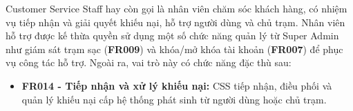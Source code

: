 
Customer Service Staff hay còn gọi là nhân viên chăm sóc khách hàng, có nhiệm vụ tiếp nhận và giải quyết khiếu nại, hỗ trợ người dùng và chủ trạm. Nhân viên hỗ trợ được kế thừa quyền sử dụng một số chức năng quản lý từ Super Admin như giám sát trạm sạc (\textbf{FR009}) và khóa/mở khóa tài khoản (\textbf{FR007}) để phục vụ công tác hỗ trợ. Ngoài ra, vai trò này có chức năng đặc thù sau:

 \begin{itemize}
    \item \textbf{FR014 - Tiếp nhận và xử lý khiếu nại:} CSS tiếp nhận, điều phối và quản lý khiếu nại cấp hệ thống phát sinh từ người dùng hoặc chủ trạm.
 \end{itemize}


